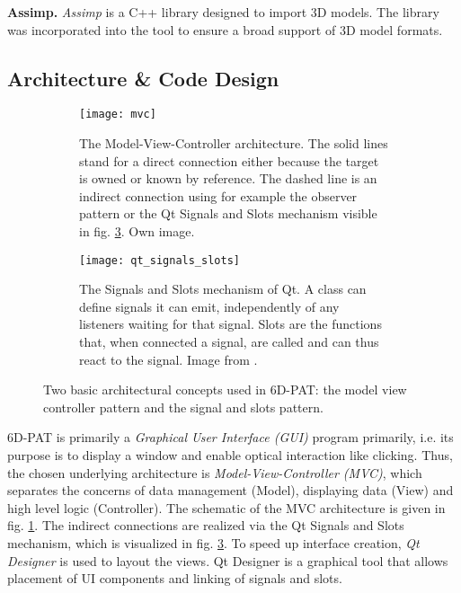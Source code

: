 \noindent\textbf{Assimp.} \textit{Assimp} \cite{assimp} is a C++ library designed to import 3D models. The library was incorporated into the tool to ensure a broad support of 3D model formats.

\subsection{Architecture \& Code Design}

\begin{figure}[!tbp]
	\centering
	\begin{subfigure}[t]{0.47\textwidth}
		\centering
    	\texttt{[image: mvc]}
    	\caption{The Model-View-Controller architecture. The solid lines stand for a direct connection either because the target is owned or known by reference. The dashed line is an indirect connection using for example the observer pattern or the Qt Signals and Slots mechanism visible in fig. \ref{fig:qt_signals_slots}. Own image.}
    	\label{fig:mvc}
	\end{subfigure}
	\hfill
	\begin{subfigure}[t]{0.47\textwidth}
	\centering
    	\texttt{[image: qt\_signals\_slots]}
    	\caption{The Signals and Slots mechanism of Qt. A class can define signals it can emit, independently of any listeners waiting for that signal. Slots are the functions that, when connected a signal, are called and can thus react to the signal. Image from \cite{qt_signals_and_slots}.}
    	\label{fig:qt_signals_slots}
	\end{subfigure}
	\caption{Two basic architectural concepts used in 6D-PAT: the model view controller pattern and the signal and slots pattern.}
\end{figure} 

6D-PAT is primarily a \textit{Graphical User Interface (GUI)} program primarily, i.e. its purpose is to display a window and enable optical interaction like clicking. Thus, the chosen underlying architecture is \textit{Model-View-Controller (MVC)}, which separates the concerns of data management (Model), displaying data (View) and high level logic (Controller). The schematic of the MVC architecture is given in fig. \ref{fig:mvc}. The indirect connections are realized via the Qt Signals and Slots mechanism, which is visualized in fig. \ref{fig:qt_signals_slots}. To speed up interface creation, \textit{Qt Designer} is used to layout the views. Qt Designer is a graphical tool that allows placement of UI components and linking of signals and slots. \\

